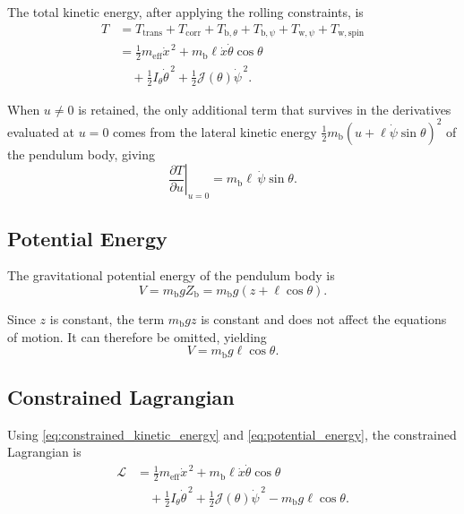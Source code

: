 \documentclass[journal]{IEEEtran}
\begin{document}
The total kinetic energy, after applying the rolling constraints, is
\begin{align}
    T
    &=
    T_{\mathrm{trans}}
    +
    T_{\mathrm{corr}}
    +
    T_{\mathrm b,\theta}
    +
    T_{\mathrm b,\psi}
    +
    T_{\mathrm w,\psi}
    +
    T_{\mathrm w,\mathrm{spin}}
    \nonumber\\
    &=
    \frac{1}{2}
    m_{\mathrm{eff}}
    \dot{x}^{\,2}
    +
    m_{\mathrm b}\ell
    \dot{x}\dot{\theta}\cos\theta
    \nonumber\\
    &\quad
    +
    \frac{1}{2}
    I_{\theta}
    \dot{\theta}^{\,2}
    +
    \frac{1}{2}
    \mathcal{J}(\theta)
    \dot{\psi}^{\,2}.
    \label{eq:constrained_kinetic_energy}
\end{align}

When $u\neq 0$ is retained, the only additional term that survives in the
derivatives evaluated at $u=0$ comes from the lateral kinetic energy
$\tfrac12 m_{\mathrm b}\left(u+\ell\dot\psi\sin\theta\right)^2$ of the
pendulum body, giving
\begin{equation}
    \left.\frac{\partial T}{\partial u}\right|_{u=0}
    =
    m_{\mathrm b}\ell\,\dot{\psi}\sin\theta .
    \label{eq:dT_du}
\end{equation}

\subsection{Potential Energy}

The gravitational potential energy of the pendulum body is
\begin{equation}
    V
    =
    m_{\mathrm b}g Z_{\mathrm b}
    =
    m_{\mathrm b}g
    \left(
        z+\ell\cos\theta
    \right).
    \label{eq:potential_full}
\end{equation}

Since $z$ is constant, the term $m_{\mathrm b}gz$ is constant and does
not affect the equations of motion. It can therefore be omitted,
yielding
\begin{equation}
    V
    =
    m_{\mathrm b}g\ell\cos\theta.
    \label{eq:potential_energy}
\end{equation}

\subsection{Constrained Lagrangian}

Using \eqref{eq:constrained_kinetic_energy} and
\eqref{eq:potential_energy}, the constrained Lagrangian is
\begin{align}
    \mathcal{L}
    &=
    \frac{1}{2}
    m_{\mathrm{eff}}
    \dot{x}^{\,2}
    +
    m_{\mathrm b}\ell
    \dot{x}\dot{\theta}\cos\theta
    \nonumber\\
    &\quad
    +
    \frac{1}{2}
    I_{\theta}
    \dot{\theta}^{\,2}
    +
    \frac{1}{2}
    \mathcal{J}(\theta)
    \dot{\psi}^{\,2}
    -
    m_{\mathrm b}g\ell\cos\theta.
    \label{eq:constrained_lagrangian}
\end{align}
\end{document}
